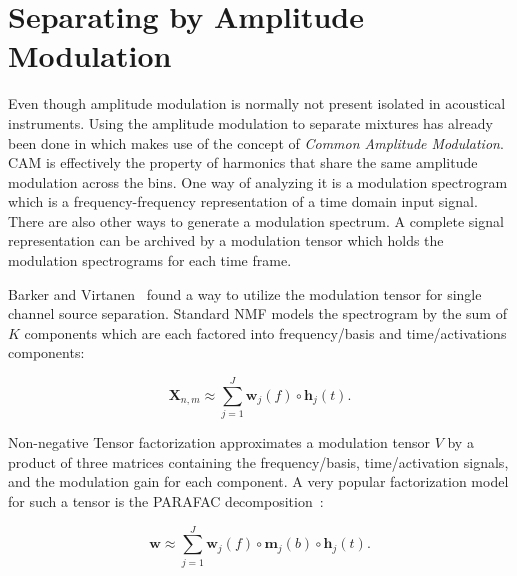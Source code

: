 \section{Separating by Amplitude Modulation}
\label{sub:am}



Even though amplitude modulation is normally not present isolated in acoustical instruments.
Using the amplitude modulation to separate mixtures has already been done in \cite{li09} which makes use of the concept of \emph{Common Amplitude Modulation}.
\textsc{CAM} is effectively the property of harmonics that share the same amplitude modulation across the bins.
One way of analyzing it is a modulation spectrogram which is a frequency-frequency representation of a time domain input signal.
There are also other ways to generate a modulation spectrum.
A complete signal representation can be archived by a modulation tensor which holds the modulation spectrograms for each time frame.


Barker and Virtanen~\cite{barker13} found a way to utilize the modulation tensor for single channel source separation. Standard NMF models the spectrogram by the sum of $K$ components which are each factored into frequency/basis and time/activations components:

\begin{equation}
   \mathbf{X}_{n,m} \approx \sum\limits_{j=1}^{J} \mathbf{w}_{j}(f) \circ  \mathbf{h}_{j}(t).
\end{equation}

Non-negative Tensor factorization approximates a modulation tensor \(V\) by a product of three matrices containing the frequency/basis, time/activation signals, and the modulation gain for each component.
A very popular factorization model for such a tensor is the PARAFAC decomposition~\cite{nmfbook}:

\begin{equation}
   \mathbf{w} \approx \sum\limits_{j=1}^{J} \mathbf{w}_{j}(f) \circ \mathbf{m}_{j}(b) \circ \mathbf{h}_{j}(t).
\end{equation}

